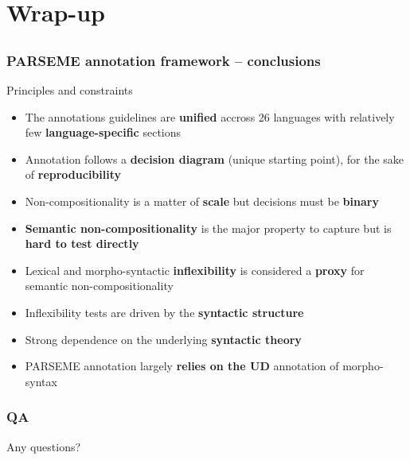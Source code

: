 \documentclass[xcolor=dvipsnames]{beamer}
\begin{document}
\section{Wrap-up}  
\subsection{}

\begin{frame}
   \frametitle{PARSEME annotation framework -- conclusions}

\begin{scriptsize}

\begin{block}{Principles and constraints} 
\begin{itemize}
\item The annotations guidelines are \textbf{unified} accross 26 languages with relatively few \textbf{language-specific} sections 
\item Annotation follows a \textbf{decision diagram} (unique starting point), for the sake of \textbf{reproducibility}
\item Non-compositionality is a matter of \textbf{scale} but decisions must be \textbf{binary}
\item \textbf{Semantic non-compositionality} is the major property to capture but is \textbf{hard to test directly}
\item Lexical and morpho-syntactic \textbf{inflexibility} is considered a \textbf{proxy} for semantic non-compositionality
\item Inflexibility tests are driven by the \textbf{syntactic structure}
\item Strong dependence on the underlying \textbf{syntactic theory}
\item PARSEME annotation largely \textbf{relies on the UD} annotation of morpho-syntax
\end{itemize}
\end{block}

\end{scriptsize}

\end{frame}

\begin{frame} 
\frametitle{QA}

\begin{block}{}
Any questions?
\end{block}
\end{frame}
\end{document}

